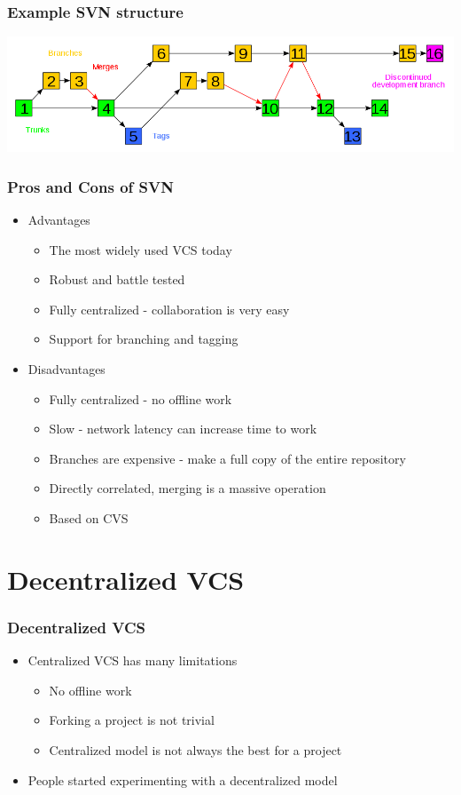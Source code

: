 \documentclass{beamer}
\begin{document}
\begin{frame}
  \frametitle{Example SVN structure}
  \includegraphics[scale = 0.30]{images/Subversion_project_visualization.png}
\end{frame}

\begin{frame}
  \frametitle{Pros and Cons of SVN}
  \begin{itemize}
    \item Advantages
      \begin{itemize}
	\item The most widely used VCS today
	\item Robust and battle tested
	\item Fully centralized - collaboration is very easy
	\item Support for branching and tagging
      \end{itemize}
    \item Disadvantages
      \begin{itemize}
	\item Fully centralized - no offline work
	\item Slow - network latency can increase time to work
        \item Branches are expensive - make a full copy of the entire repository
        \item Directly correlated, merging is a massive operation
	\item Based on CVS
      \end{itemize}
  \end{itemize}
\end{frame}

\section{Decentralized VCS}

\begin{frame}
  \frametitle{Decentralized VCS}
  \begin{itemize}
    \item Centralized VCS has many limitations
      \begin{itemize}
	\item No offline work
	\item Forking a project is not trivial
	\item Centralized model is not always the best for a project
      \end{itemize}
    \item People started experimenting with a decentralized model
  \end{itemize}
\end{frame}
\end{document}
